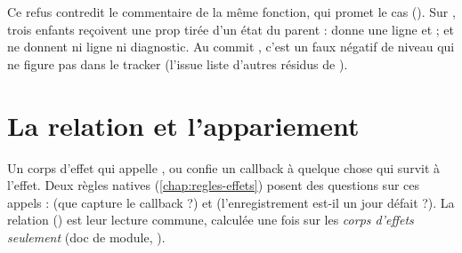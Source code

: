 \begin{remarque}
Ce refus contredit le commentaire de la même fonction, qui promet le cas  (). Sur , trois enfants reçoivent une prop tirée d'un état du parent :  donne une ligne  et  ;  et  ne donnent ni ligne ni diagnostic. Au commit \snapshotCommit, c'est un faux négatif de niveau \Warning{} qui ne figure pas dans le tracker (l'issue  liste d'autres résidus de ).
\end{remarque}

\section{La relation  et l'appariement}
\label{sec:relations-registrations}
Un corps d'effet qui appelle ,  ou  confie un callback à quelque chose qui survit à l'effet. Deux règles natives (\cref{chap:regles-effets}) posent des questions sur ces appels :  (\og que capture le callback ?\fg{}) et  (\og l'enregistrement est-il un jour défait ?\fg{}). La relation  () est leur lecture commune, calculée une fois sur les \emph{corps d'effets seulement} (doc de module, ).

